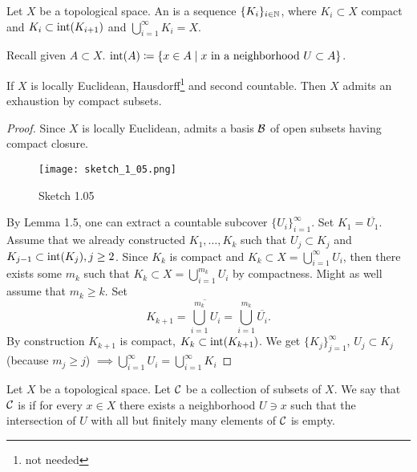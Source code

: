 \begin{definition*}
    Let \(X\) be a topological space. An  is a sequence \(\{K_i\}_{i\in\mathbb{N}}\),
    where \(K_i\subset X\) compact and \(K_i\subset \text{int}(K_{i+1})\) and \(\bigcup_{i=1}^\infty K_i=X\).
\end{definition*}

Recall given \(A\subset X\). \(\text{int}(A)\coloneqq \{x\in A\mid x \text{ in a neighborhood } U\subset A\}\).


\begin{lemma}\label{lem:1.6}
    If \(X\) is locally Euclidean, Hausdorff\footnote{not needed} and second countable. Then \(X\) admits an exhaustion by compact subsets.
\end{lemma}

\begin{proof}
    Since \(X\) is locally Euclidean, admits a basis \(\mathcal{B}\) of open subsets having compact closure.
    \begin{figure}[H]
        \centering
        \texttt{[image: sketch\_1\_05.png]}
        \caption{Sketch 1.05}
    \end{figure}
    By Lemma 1.5, one can extract a countable subcover \(\{U_i\}_{i=1}^\infty\). Set \(K_1=\overline{U_1}\).
    Assume that we already constructed \(K_1,\dots,K_k\) such that \(U_j\subset K_j\)
    and \(K_{j-1}\subset\text{int}(K_j),j\geq 2\). Since \(K_k\) is compact and \(K_k\subset X=\bigcup_{i=1}^\infty U_i\), then there exists some \(m_k\) such that 
    \(K_k\subset X=\bigcup_{i=1}^{m_k} U_i\) by compactness. Might as well assume that \(m_k\geq k\). Set 
    \[K_{k+1}=\overline{\bigcup_{i=1}^{m_k} U_i}=\bigcup_{i=1}^{m_k} \overline{U_i}.\] By construction \(K_{k+1}\) 
    is compact, \(K_k\subset \text{int}(K_{k+1})\). We get \(\{K_j\}_{j=1}^\infty\), \(U_j\subset K_j\) (because \(m_j\geq j\)) \(\implies \bigcup_{i=1}^\infty U_i=\bigcup_{i=1}^\infty K_i\)
\end{proof}

\begin{definition*}\label{def:local_finiteness}
    Let \(X\) be a topological space. Let \(\mathcal{C}\) be a collection of subsets of \(X\). We say that \(\mathcal{C}\) 
    is  if for every \(x\in X\) there exists a neighborhood \(U\ni x\) such that 
    the intersection of \(U\) with all but finitely many elements of \(\mathcal{C}\) is empty.
\end{definition*}


